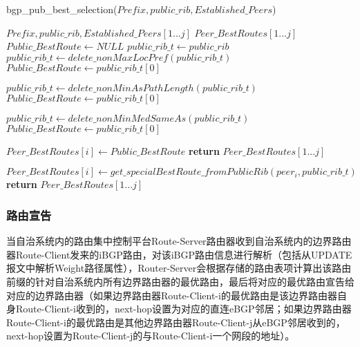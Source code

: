 \begin{algorithm}[!h]
    \caption{bgp\_pub\_best\_selection($Prefix, public\_rib, Established\_Peers$)}
    \label{alg:public_selection_one}
    \begin{algorithmic}[1]%
        \REQUIRE
        $Prefix, public\_rib, Established\_Peers[1...j]$
        \ENSURE
        $Peer\_BestRoutes[1...j]$
        \STATE $Public\_BestRoute \gets NULL$
        \STATE $public\_rib\_t \gets public\_rib$
        \STATE $public\_rib\_t \gets delete\_nonMaxLocPref(public\_rib\_t)$
        \STATE $Public\_BestRoute  \gets public\_rib\_t[0]$
        \ENDIF

        \STATE $public\_rib\_t \gets delete\_nonMinAsPathLength(public\_rib\_t)$
        \STATE $Public\_BestRoute  \gets public\_rib\_t[0]$
        \ENDIF

        \STATE $public\_rib\_t \gets delete\_nonMinMedSameAs(public\_rib\_t)$
        \STATE $Public\_BestRoute  \gets public\_rib\_t[0]$
        \ENDIF

        \STATE $Peer\_BestRoutes[i] \gets Public\_BestRoute $
        \ENDFOR
        \STATE \textbf{return} $Peer\_BestRoutes[1...j]$
        \ENDIF

        \STATE $Peer\_BestRoutes[i] \gets get\_specialBestRoute\_fromPublicRib(peer_i,public\_rib\_t)$
        \ENDFOR
        \STATE \textbf{return} $Peer\_BestRoutes[1...j]$
    \end{algorithmic}
\end{algorithm}





\subsubsection{路由宣告}
当自治系统内的路由集中控制平台Route-Server路由器收到自治系统内的边界路由器Route-Client发来的iBGP路由，对该iBGP路由信息进行解析（包括从UPDATE报文中解析Weight路径属性），Router-Server会根据存储的路由表项计算出该路由前缀的针对自治系统内所有边界路由器的最优路由，最后将对应的最优路由宣告给对应的边界路由器（如果边界路由器Route-Client-i的最优路由是该边界路由器自身Route-Client-i收到的，next-hop设置为对应的直连eBGP邻居；如果边界路由器Route-Client-i的最优路由是其他边界路由器Route-Client-j从eBGP邻居收到的，next-hop设置为Route-Client-j的与Route-Client-i一个网段的地址）。

